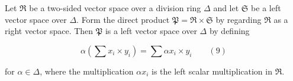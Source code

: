 Let $\mathfrak{R}$ be a two-sided vector space over a division ring $\Delta$ and let $\mathfrak{S}$ be a left vector space over $\Delta$. Form the direct product $\mathfrak{P} = \mathfrak{R} \times \mathfrak{S}$ by regarding $\mathfrak{R}$ as a right vector space. Then $\mathfrak{P}$ is a left vector space over $\Delta$ by defining

$$\alpha\left(\sum x_i \times y_i\right) = \sum \alpha x_i \times y_i \qquad (9)$$

for $\alpha \in \Delta$, where the multiplication $\alpha x_i$ is the left scalar multiplication in $\mathfrak{R}$.
